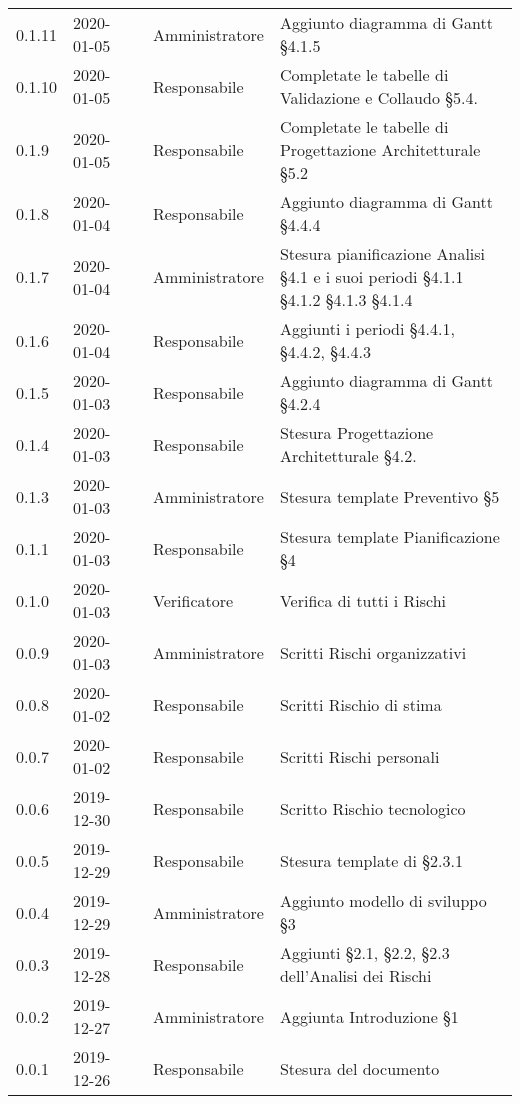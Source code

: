 {\begin{longtable}{C{2cm} C{2cm}  C{3cm}  C{3cm} C{4.5cm}}
0.1.11 & 2020-01-05 & \LD{} & Amministratore & Aggiunto diagramma di Gantt §4.1.5 \\
0.1.10 & 2020-01-05 & \SE{} & Responsabile & Completate le tabelle di Validazione e Collaudo §5.4.\\
0.1.9 & 2020-01-05 & \SE{} & Responsabile & Completate le tabelle di Progettazione Architetturale §5.2\\
0.1.8 & 2020-01-04 & \SE{} & Responsabile & Aggiunto diagramma di Gantt §4.4.4 \\
0.1.7 & 2020-01-04 & \LD{} & Amministratore & Stesura pianificazione Analisi §4.1 e i suoi periodi §4.1.1 §4.1.2 §4.1.3 §4.1.4 \\
0.1.6 & 2020-01-04 & \SE{} & Responsabile & Aggiunti i periodi §4.4.1, §4.4.2, §4.4.3\\
0.1.5 & 2020-01-03 & \SE{} & Responsabile & Aggiunto diagramma di Gantt §4.2.4\\
0.1.4 & 2020-01-03 & \SE{} & Responsabile & Stesura Progettazione Architetturale §4.2.\\
0.1.3 & 2020-01-03 & \LD{} & Amministratore & Stesura template Preventivo §5\\
0.1.1 & 2020-01-03 &  \SE{} & Responsabile & Stesura template Pianificazione §4\\
0.1.0 & 2020-01-03 &\AT{} & Verificatore & Verifica di tutti i Rischi  \\
0.0.9 & 2020-01-03 & \LD{} & Amministratore & Scritti Rischi organizzativi \\
0.0.8 & 2020-01-02 &  \SE{} & Responsabile & Scritti Rischio di stima \\
0.0.7 & 2020-01-02 & \SE{} & Responsabile & Scritti Rischi personali \\
0.0.6 & 2019-12-30 & \SE{} & Responsabile & Scritto Rischio tecnologico \\
0.0.5 & 2019-12-29 & \SE{} & Responsabile & Stesura template di §2.3.1\\
0.0.4 & 2019-12-29 & \LD{} & Amministratore & Aggiunto modello di sviluppo §3\\
0.0.3 & 2019-12-28 & \SE{} & Responsabile & Aggiunti §2.1, §2.2, §2.3 dell'Analisi dei Rischi \\
0.0.2 & 2019-12-27 & \LD{} & Amministratore & Aggiunta Introduzione §1 \\
0.0.1 & 2019-12-26 & \SE{} & Responsabile & Stesura del documento  \\
		
\end{longtable}
}